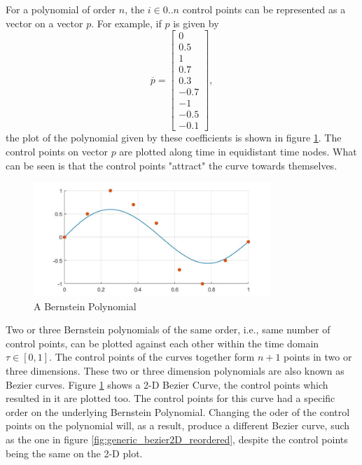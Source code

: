 \par For a polynomial of order $n$, the $i \in {0 .. n}$ control points can be represented as a vector on a vector $p$. For example, if $p$ is given by 
\begin{equation}
    \overline{p} = \begin{bmatrix}0\\ 0.5\\ 1\\ 0.7\\ 0.3\\ -0.7\\ -1\\ -0.5\\ -0.1\end{bmatrix},
\end{equation}
the plot of the polynomial given by these coefficients is shown in figure \ref{fig:generic_bezier}. The control points on vector $p$ are plotted along time in equidistant time nodes. What can be seen is that the control points "attract" the curve towards themselves.

\begin{figure}[h!]
\centering
\includegraphics[width=0.8\textwidth]{Images/generic_bezier.jpg}
\caption{A Bernstein Polynomial}
\label{fig:generic_bezier}
\end{figure}


\par Two or three Bernstein polynomials of the same order, i.e., same number of control points, can be plotted against each other within the time domain $\tau \in [0,1]$. The control points of the curves together form $n+1$ points in two or three dimensions. These two or three dimension polynomials are also known as Bezier curves. Figure \ref{fig:generic_bezier} shows a 2-D Bezier Curve, the control points which resulted in it are plotted too. The control points for this curve had a specific order on the underlying Bernstein Polynomial. Changing the oder of the control points on the polynomial will, as a result, produce a different Bezier curve, such as the one in figure \ref{fig:generic_bezier2D_reordered}, despite the control points being the same on the 2-D plot.

